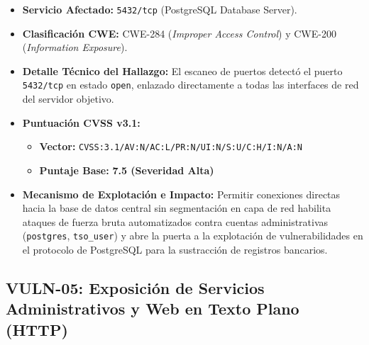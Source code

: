 \begin{itemize}
  \item \textbf{Servicio Afectado:} \texttt{5432/tcp} (PostgreSQL Database Server).
  \item \textbf{Clasificación CWE:} CWE-284 (\textit{Improper Access Control}) y CWE-200 (\textit{Information Exposure}).
  \item \textbf{Detalle Técnico del Hallazgo:} El escaneo de puertos detectó el puerto \texttt{5432/tcp} en estado \texttt{open}, enlazado directamente a todas las interfaces de red del servidor objetivo.
  \item \textbf{Puntuación CVSS v3.1:}
    \begin{itemize}
      \item \textbf{Vector:} \texttt{CVSS:3.1/AV:N/AC:L/PR:N/UI:N/S:U/C:H/I:N/A:N}
      \item \textbf{Puntaje Base:} \textbf{7.5 (Severidad Alta)}
    \end{itemize}
  \item \textbf{Mecanismo de Explotación e Impacto:} Permitir conexiones directas hacia la base de datos central sin segmentación en capa de red habilita ataques de fuerza bruta automatizados contra cuentas administrativas (\texttt{postgres}, \texttt{tso\_user}) y abre la puerta a la explotación de vulnerabilidades en el protocolo de PostgreSQL para la sustracción de registros bancarios.
\end{itemize}

\subsection{VULN-05: Exposición de Servicios Administrativos y Web en Texto Plano (HTTP)}

